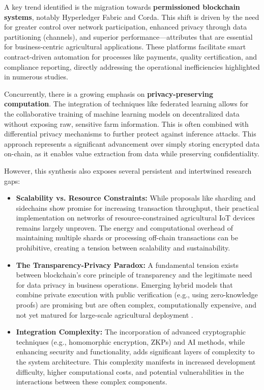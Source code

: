 \documentclass[12pt,onecolumn]{IEEEtran} %
\begin{document}
A key trend identified is the migration towards \textbf{permissioned blockchain systems}, notably Hyperledger Fabric and Corda. This shift is driven by the need for greater control over network participation, enhanced privacy through data partitioning (channels), and superior performance—attributes that are essential for business-centric agricultural applications. These platforms facilitate smart contract-driven automation for processes like payments, quality certification, and compliance reporting, directly addressing the operational inefficiencies highlighted in numerous studies.

Concurrently, there is a growing emphasis on \textbf{privacy-preserving computation}. The integration of techniques like federated learning \cite{daund2025designofan} allows for the collaborative training of machine learning models on decentralized data without exposing raw, sensitive farm information. This is often combined with differential privacy mechanisms to further protect against inference attacks. This approach represents a significant advancement over simply storing encrypted data on-chain, as it enables value extraction from data while preserving confidentiality.

However, this synthesis also exposes several persistent and intertwined research gaps:
\begin{itemize}
    \item \textbf{Scalability vs. Resource Constraints:} While proposals like sharding and sidechains show promise for increasing transaction throughput, their practical implementation on networks of resource-constrained agricultural IoT devices remains largely unproven. The energy and computational overhead of maintaining multiple shards or processing off-chain transactions can be prohibitive, creating a tension between scalability and sustainability.
    \item \textbf{The Transparency-Privacy Paradox:} A fundamental tension exists between blockchain's core principle of transparency and the legitimate need for data privacy in business operations. Emerging hybrid models that combine private execution with public verification (e.g., using zero-knowledge proofs) are promising but are often complex, computationally expensive, and not yet matured for large-scale agricultural deployment \cite{soy2025blockchainintegrationin}.
    \item \textbf{Integration Complexity:} The incorporation of advanced cryptographic techniques (e.g., homomorphic encryption, ZKPs) and AI methods, while enhancing security and functionality, adds significant layers of complexity to the system architecture. This complexity manifests in increased development difficulty, higher computational costs, and potential vulnerabilities in the interactions between these complex components.
\end{itemize}
\end{document}
